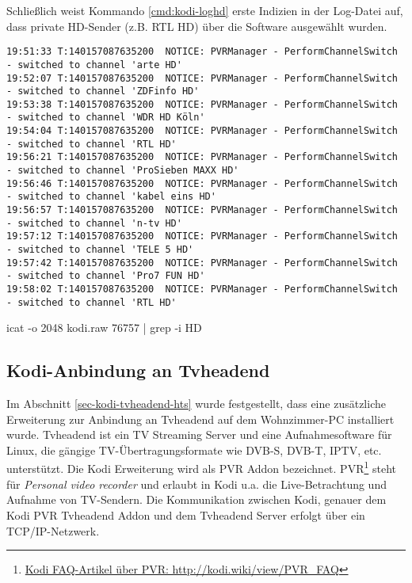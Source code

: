 Schließlich weist Kommando \autoref{cmd:kodi-loghd} erste Indizien in der Log-Datei auf, dass private HD-Sender (z.B. RTL HD) über die Software ausgewählt wurden.

\begin{cmd}[H]
\begin{Verbatim}[fontsize=\tiny]
19:51:33 T:140157087635200  NOTICE: PVRManager - PerformChannelSwitch - switched to channel 'arte HD'
19:52:07 T:140157087635200  NOTICE: PVRManager - PerformChannelSwitch - switched to channel 'ZDFinfo HD'
19:53:38 T:140157087635200  NOTICE: PVRManager - PerformChannelSwitch - switched to channel 'WDR HD Köln'
19:54:04 T:140157087635200  NOTICE: PVRManager - PerformChannelSwitch - switched to channel 'RTL HD'
19:56:21 T:140157087635200  NOTICE: PVRManager - PerformChannelSwitch - switched to channel 'ProSieben MAXX HD'
19:56:46 T:140157087635200  NOTICE: PVRManager - PerformChannelSwitch - switched to channel 'kabel eins HD'
19:56:57 T:140157087635200  NOTICE: PVRManager - PerformChannelSwitch - switched to channel 'n-tv HD'
19:57:12 T:140157087635200  NOTICE: PVRManager - PerformChannelSwitch - switched to channel 'TELE 5 HD'
19:57:42 T:140157087635200  NOTICE: PVRManager - PerformChannelSwitch - switched to channel 'Pro7 FUN HD'
19:58:02 T:140157087635200  NOTICE: PVRManager - PerformChannelSwitch - switched to channel 'RTL HD'
\end{Verbatim}
\caption{icat -o 2048 kodi.raw 76757 | grep -i HD}
\label{cmd:kodi-loghd}
\end{cmd}

\subsection{Kodi-Anbindung an Tvheadend}
\label{sec:kodi-tvheadend}

Im Abschnitt \autoref{sec-kodi-tvheadend-hts} wurde festgestellt, dass eine zusätzliche Erweiterung zur Anbindung an Tvheadend auf dem Wohnzimmer-PC installiert wurde. Tvheadend ist ein TV Streaming Server und eine Aufnahmesoftware für Linux, die gängige TV-Übertragungsformate wie DVB-S, DVB-T, IPTV, etc. unterstützt. Die Kodi Erweiterung wird als PVR Addon bezeichnet. PVR\footnote{\href{http://kodi.wiki/view/PVR\_FAQ}{Kodi FAQ-Artikel über PVR: http://kodi.wiki/view/PVR\_FAQ}} steht für \textit{Personal video recorder} und erlaubt in Kodi u.a. die Live-Betrachtung und Aufnahme von TV-Sendern. Die Kommunikation zwischen Kodi, genauer dem Kodi PVR Tvheadend Addon und dem Tvheadend Server erfolgt über ein TCP/IP-Netzwerk.

